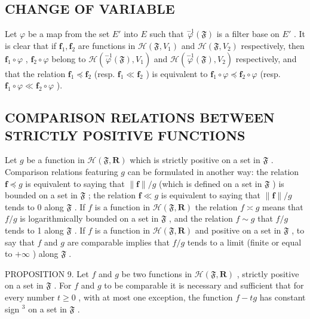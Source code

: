 \subsection{CHANGE OF VARIABLE}

Let \(\varphi\) be a map from the set \(E'\) into \(E\) such that \(\overset{-1}{\varphi}(\mathfrak{F})\) is a filter base on \(E'\) . It is clear that if \(\mathbf{f}_1, \mathbf{f}_2\) are functions in \(\mathcal{H}(\mathfrak{F}, V_1)\) and \(\mathcal{H}(\mathfrak{F}, V_2)\) respectively, then \(\mathbf{f}_1 \circ \varphi\) , \(\mathbf{f}_2 \circ \varphi\) belong to \(\mathcal{H}(\overset{-1}{\varphi}(\mathfrak{F}), V_1)\) and \(\mathcal{H}(\overset{-1}{\varphi}(\mathfrak{F}), V_2)\) respectively, and that the relation \(\mathbf{f}_1 \preccurlyeq \mathbf{f}_2\) (resp. \(\mathbf{f}_1 \ll \mathbf{f}_2\) ) is equivalent to \(\mathbf{f}_1 \circ \varphi \preccurlyeq \mathbf{f}_2 \circ \varphi\) (resp. \(\mathbf{f}_1 \circ \varphi \ll \mathbf{f}_2 \circ \varphi\) ).

\subsection{COMPARISON RELATIONS BETWEEN STRICTLY POSITIVE FUNCTIONS}

Let \(g\) be a function in \(\mathcal{H}(\mathfrak{F},\mathbf{R})\) which is strictly positive on a set in \(\mathfrak{F}\) . Comparison relations featuring \(g\) can be formulated in another way: the relation \(\mathbf{f} \preccurlyeq g\) is equivalent to saying that \(\| \mathbf{f}\| /g\) (which is defined on a set in \(\mathfrak{F}\) ) is bounded on a set in \(\mathfrak{F}\) ; the relation \(\mathbf{f} \ll g\) is equivalent to saying that \(\| \mathbf{f}\| /g\) tends to 0 along \(\mathfrak{F}\) . If \(f\) is a function in \(\mathcal{H}(\mathfrak{F},\mathbf{R})\) the relation \(f\asymp g\) means that \(f / g\) is logarithmically bounded on a set in \(\mathfrak{F}\) , and the relation \(f\sim g\) that \(f / g\) tends to 1 along \(\mathfrak{F}\) . If \(f\) is a function in \(\mathcal{H}(\mathfrak{F},\mathbf{R})\) and positive on a set in \(\mathfrak{F}\) , to say that \(f\) and \(g\) are comparable implies that \(f / g\) tends to a limit (finite or equal to \(+\infty\) ) along \(\mathfrak{F}\) .

PROPOSITION 9. Let \(f\) and \(g\) be two functions in \(\mathcal{H}(\mathfrak{F},\mathbf{R})\) , strictly positive on a set in \(\mathfrak{F}\) . For \(f\) and \(g\) to be comparable it is necessary and sufficient that for every number \(t \geqslant 0\) , with at most one exception, the function \(f - tg\) has constant sign \(^3\) on a set in \(\mathfrak{F}\) .

